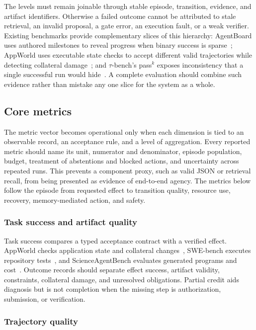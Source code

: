 The levels must remain joinable through stable episode, transition, evidence, and artifact identifiers. Otherwise a failed outcome cannot be attributed to stale retrieval, an invalid proposal, a gate error, an execution fault, or a weak verifier. Existing benchmarks provide complementary slices of this hierarchy: AgentBoard uses authored milestones to reveal progress when binary success is sparse~\cite{hsieh2024agentboard}; AppWorld uses executable state checks to accept different valid trajectories while detecting collateral damage~\cite{trivedi2024appworld}; and $\tau$-bench's pass$^k$ exposes inconsistency that a single successful run would hide~\cite{yao2024taubench}. A complete evaluation should combine such evidence rather than mistake any one slice for the system as a whole.

\subsection{Core metrics}

The metric vector becomes operational only when each dimension is tied to an observable record, an acceptance rule, and a level of aggregation. Every reported metric should name its unit, numerator and denominator, episode population, budget, treatment of abstentions and blocked actions, and uncertainty across repeated runs. This prevents a component proxy, such as valid JSON or retrieval recall, from being presented as evidence of end-to-end agency. The metrics below follow the episode from requested effect to transition quality, resource use, recovery, memory-mediated action, and safety.

\subsubsection{Task success and artifact quality}

Task success compares a typed acceptance contract with a verified effect. AppWorld checks application state and collateral changes~\cite{trivedi2024appworld}, SWE-bench executes repository tests~\cite{jimenez2024swebench}, and ScienceAgentBench evaluates generated programs and cost~\cite{chen2025scienceagentbench}. Outcome records should separate effect success, artifact validity, constraints, collateral damage, and unresolved obligations. Partial credit aids diagnosis but is not completion when the missing step is authorization, submission, or verification.

\subsubsection{Trajectory quality}


